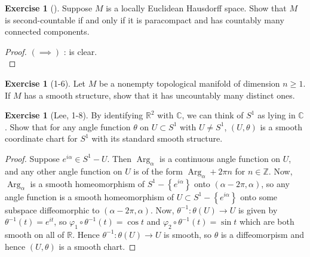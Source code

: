 \documentclass[reqno]{amsart}
\theoremstyle{plain}%
\theoremstyle{definition}
\newtheorem{exercise}[theorem]{Exercise}
\theoremstyle{remark}
\DeclareMathOperator{\Arg}{Arg}
\begin{document}
    \begin{exercise}[]
        Suppose $M$ is a locally Euclidean Hausdorff space.
        Show that $M$ is second-countable if and only if it is
        paracompact and has countably many connected components.
    \end{exercise}

    \begin{proof}
        $\left( \implies \right) $ : is clear.\\
    \end{proof}

    \begin{exercise}[1-6]
        Let $M$ be a nonempty topological manifold of dimension $n\ge 1$. If
        $M$ has a smooth structure, show that it has uncountably many distinct
        ones.
    \end{exercise}

    \begin{exercise}[Lee, 1-8]
        By identifying $\mathbb{R}^2$ with $\mathbb{C}$, we can think of
        $S^{1}$ as lying in $\mathbb{C}$. Show that for any angle function
        $\theta$
        on $U \subset S^{1}$ with $U \neq S^{1}$, 
        $\left( U, \theta \right) $ is a smooth coordinate chart
        for $S^{1}$ with its standard smooth structure.
    \end{exercise}

    \begin{proof}
        Suppose $e^{i \alpha} \in S^{1} - U$. Then
        $\Arg_{\alpha}$ is a continuous angle function on
        $U$, and any other angle function on $U$ is of the form
        $\Arg_{\alpha} + 2 \pi n$ for $n \in \mathbb{Z}$.
        Now, $\Arg_{\alpha}$ is a smooth homeomorphism of
        $S^{1} - \left\{ e^{i \alpha} \right\} $ onto
        $\left( \alpha - 2 \pi, \alpha \right) $, so
        any angle function is a smooth homeomorphism of
        $U \subset S^{1} - \left\{ e^{i \alpha} \right\} $ onto some
        subspace diffeomorphic to $\left( \alpha - 2\pi, \alpha \right) $.
        Now, $\theta^{-1}  \colon \theta (U) \to U$ is given by
        $\theta^{-1} (t) = e^{it}$, so
        $\varphi_1 \circ \theta^{-1}(t) = \cos t$ and
        $\varphi_2 \circ \theta^{-1}(t) = \sin t$ which are both
        smooth on all of $\mathbb{R}$. Hence
        $\theta^{-1}  \colon \theta (U) \to U$ is smooth, so
        $\theta$ is a diffeomorpism and hence
        $\left( U, \theta \right) $ is a smooth chart.
    \end{proof}
\end{document}
